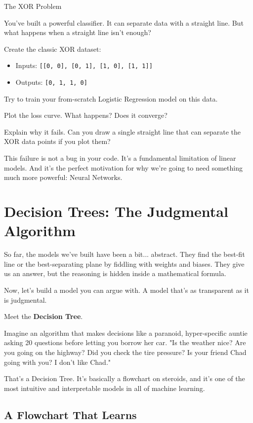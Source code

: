 \documentclass[11pt, letterpaper, openany]{book}
\begin{document}
\begin{challengebox}
The XOR Problem

You've built a powerful classifier. It can separate data with a straight line. But what happens when a straight line isn't enough?

Create the classic XOR dataset:
\begin{itemize}
    \item Inputs: \texttt{[[0, 0], [0, 1], [1, 0], [1, 1]]}
    \item Outputs: \texttt{[0, 1, 1, 0]}
\end{itemize}
Try to train your from-scratch Logistic Regression model on this data.

Plot the loss curve. What happens? Does it converge?

Explain why it fails. Can you draw a single straight line that can separate the XOR data points if you plot them?

This failure is not a bug in your code. It's a fundamental limitation of linear models. And it's the perfect motivation for why we're going to need something much more powerful: Neural Networks.
\end{challengebox}

\chapter{Decision Trees: The Judgmental Algorithm}

So far, the models we've built have been a bit... abstract. They find the best-fit line or the best-separating plane by fiddling with weights and biases. They give us an answer, but the reasoning is hidden inside a mathematical formula.

Now, let's build a model you can argue with. A model that's as transparent as it is judgmental.

Meet the \textbf{Decision Tree}.

Imagine an algorithm that makes decisions like a paranoid, hyper-specific auntie asking 20 questions before letting you borrow her car. "Is the weather nice? Are you going on the highway? Did you check the tire pressure? Is your friend Chad going with you? I don't like Chad."

That's a Decision Tree. It's basically a flowchart on steroids, and it's one of the most intuitive and interpretable models in all of machine learning.

\section{A Flowchart That Learns}
\end{document}
